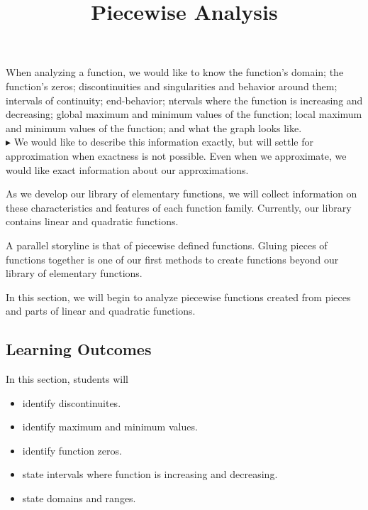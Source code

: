 \documentclass{ximera}
\title{Piecewise Analysis}
\begin{document}
\begin{abstract}
\end{abstract}
\maketitle




When analyzing a function, we would like to know the function's domain; the function's zeros; discontinuities and singularities and behavior around them; intervals of continuity; end-behavior; ntervals where the function is increasing and decreasing; global maximum and minimum values of the function; local maximum and minimum values of the function; and what the graph looks like. \\




$\blacktriangleright$ We would like to describe this information exactly, but will settle for approximation when exactness is not possible. Even when we approximate, we would like exact information about our approximations.


As we develop our library of elementary functions, we will collect information on these characteristics and features of each function family.  Currently, our library contains linear and quadratic functions.  

A parallel storyline is that of piecewise defined functions.  Gluing pieces of functions together is one of our first methods to create functions beyond our library of elementary functions.

In this section, we will begin to analyze piecewise functions created from pieces and parts of linear and quadratic functions.
















\subsection*{Learning Outcomes}


\begin{sectionOutcomes}
In this section, students will 

\begin{itemize}
\item identify discontinuites.
\item identify maximum and minimum values.
\item identify function zeros.
\item state intervals where function is increasing and decreasing.
\item state domains and ranges.
\end{itemize}
\end{sectionOutcomes}
\end{document}
